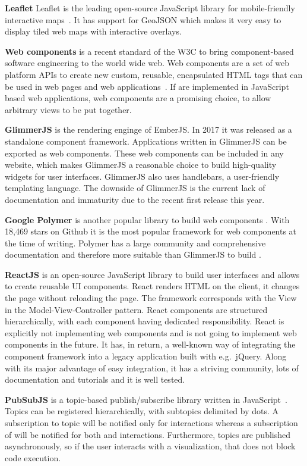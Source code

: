 \textbf{Leaflet}
Leaflet is the leading open-source JavaScript library for mobile-friendly interactive maps~\cite{Leaflet2017}.
It has support for GeoJSON which makes it very easy to display tiled web maps with interactive overlays.

\textbf{Web components} is a recent standard of the W3C\cite{W3C2017} to bring component-based software engineering to the world wide web.
Web components are a set of web platform APIs to create new custom, reusable, encapsulated HTML tags that can be used in web pages and web applications~\cite{WebComponents2017}.
If \cmvs{} are implemented in JavaScript based web applications, web components are a promising choice, to allow arbitrary views to be put together.

\textbf{GlimmerJS} is the rendering enginge of EmberJS\cite{Ember2017}.
In 2017 it was released as a standalone component framework.
Applications written in GlimmerJS can be exported as web components.
These web components can be included in any website, which makes GlimmerJS a reasonable choice to build high-quality widgets for user interfaces.
GlimmerJS also uses handlebars\cite{Handlebars2017}, a user-friendly templating language.
The downside of GlimmerJS is the current lack of documentation and immaturity due to the recent first release this year.

\textbf{Google Polymer} is another popular library to build web components \cite{Polymer2017}.
With 18,469 stars on Github it is the most popular framework for web components at the time of writing.
Polymer has a large community and comprehensive documentation and therefore more suitable than GlimmerJS to build \cmvs{}.

\textbf{ReactJS} is an open-source JavaScript library to build user interfaces and allows to create reusable UI components.
React renders HTML on the client, it changes the page without reloading the page.
The framework corresponds with the View in the Model-View-Controller pattern.
React components are structured hierarchically, with each component having dedicated responsibility.
React is explicitly not implementing web components and is not going to implement web components in the future.
It has, in return, a well-known way of integrating the component framework into a legacy application built with e.g.\ jQuery.
Along with its major advantage of easy integration, it has a striving community, lots of documentation and tutorials and it is well tested.

\textbf{PubSubJS} is a topic-based publish/subscribe library written in JavaScript~\cite{PubSubJS2017}.
Topics can be registered hierarchically, with subtopics delimited by dots.
A subscription to topic  will be notified only for  interactions whereas a subscription of  will be notified for both  and  interactions.
Furthermore, topics are published asynchronously, so if the user interacts with a visualization, that does not block code execution.




